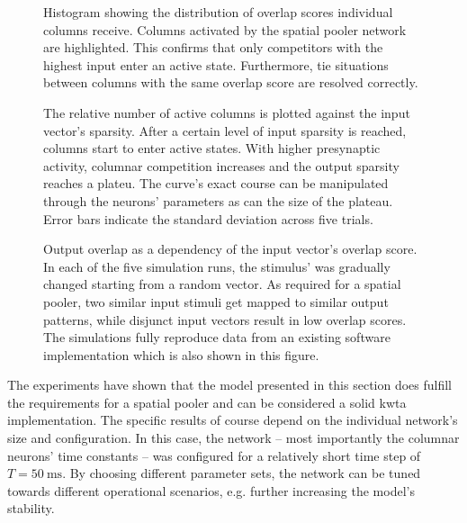 \begin{figure}
	\begin{center}
		
	\end{center}
	\caption{Histogram showing the distribution of overlap scores individual columns receive. Columns activated by the spatial pooler network are highlighted. This confirms that only competitors with the highest input enter an active state. Furthermore, tie situations between columns with the same overlap score are resolved correctly.}
	\label{fig:spatial_pooler_activity}
\end{figure}

\begin{figure}
	\begin{center}
		
	\end{center}
	\caption{The relative number of active columns is plotted against the input vector's sparsity. After a certain level of input sparsity is reached, columns start to enter active states. With higher presynaptic activity, columnar competition increases and the output sparsity reaches a plateu. The curve's exact course can be manipulated through the neurons' parameters as can the size of the plateau. Error bars indicate the standard deviation across five trials.} 
	\label{fig:spatial_pooler_sparsity}
\end{figure}

\begin{figure}
	\begin{center}
		
	\end{center}
	\caption{Output overlap as a dependency of the input vector's overlap score. In each of the five simulation runs, the stimulus' was gradually changed starting from a random vector. As required for a spatial pooler, two similar input stimuli get mapped to similar output patterns, while disjunct input vectors result in low overlap scores. The simulations fully reproduce data from an existing software implementation which is also shown in this figure.}
	\label{fig:spatial_pooler_overlap}
\end{figure}


The experiments have shown that the model presented in this section does fulfill the requirements for a spatial pooler and can be considered a solid \gls{kwta} implementation. The specific results of course depend on the individual network's size and configuration. In this case, the network -- most importantly the columnar neurons' time constants -- was configured for a relatively short time step of $T = \SI{50}{\milli\second}$. By choosing different parameter sets, the network can be tuned towards different operational scenarios, e.g. further increasing the model's stability.

